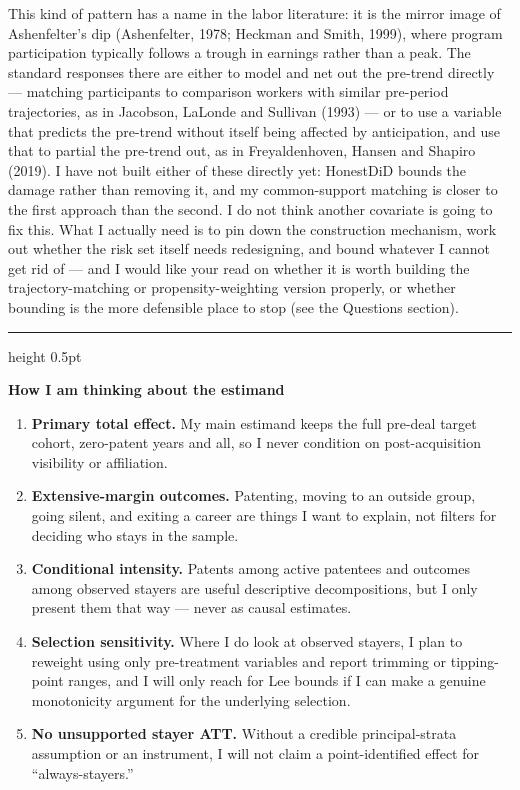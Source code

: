 \documentclass[10pt]{article}
\newcommand{\tightsection}[1]{\vspace{2pt}{\large\bfseries\color{forest}#1}\par{\color{forest!40}\hrule height 0.5pt}\vspace{2pt}}
\begin{document}
This kind of pattern has a name in the labor literature: it is the mirror image of Ashenfelter's dip (Ashenfelter, 1978; Heckman and Smith, 1999), where program participation typically follows a trough in earnings rather than a peak. The standard responses there are either to model and net out the pre-trend directly --- matching participants to comparison workers with similar pre-period trajectories, as in Jacobson, LaLonde and Sullivan (1993) --- or to use a variable that predicts the pre-trend without itself being affected by anticipation, and use that to partial the pre-trend out, as in Freyaldenhoven, Hansen and Shapiro (2019). I have not built either of these directly yet: HonestDiD bounds the damage rather than removing it, and my common-support matching is closer to the first approach than the second. I do not think another covariate is going to fix this. What I actually need is to pin down the construction mechanism, work out whether the risk set itself needs redesigning, and bound whatever I cannot get rid of --- and I would like your read on whether it is worth building the trajectory-matching or propensity-weighting version properly, or whether bounding is the more defensible place to stop (see the Questions section).

\tightsection{4. What I have tried, and what is still open}

\textbf{How I am thinking about the estimand}

\begin{enumerate}
  \item \textbf{Primary total effect.} My main estimand keeps the full pre-deal target cohort, zero-patent years and all, so I never condition on post-acquisition visibility or affiliation.
  \item \textbf{Extensive-margin outcomes.} Patenting, moving to an outside group, going silent, and exiting a career are things I want to explain, not filters for deciding who stays in the sample.
  \item \textbf{Conditional intensity.} Patents among active patentees and outcomes among observed stayers are useful descriptive decompositions, but I only present them that way --- never as causal estimates.
  \item \textbf{Selection sensitivity.} Where I do look at observed stayers, I plan to reweight using only pre-treatment variables and report trimming or tipping-point ranges, and I will only reach for Lee bounds if I can make a genuine monotonicity argument for the underlying selection.
  \item \textbf{No unsupported stayer ATT.} Without a credible principal-strata assumption or an instrument, I will not claim a point-identified effect for ``always-stayers.''
\end{enumerate}
\end{document}
